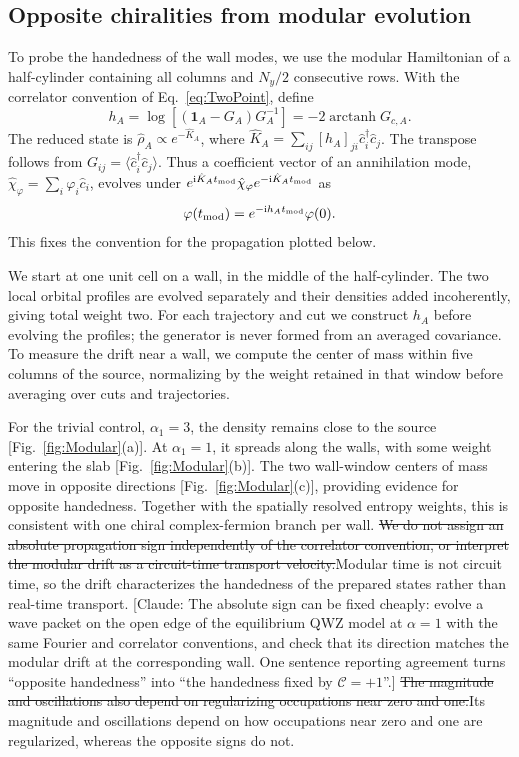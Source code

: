 \documentclass[aps,prb,10pt,twocolumn,superscriptaddress,longbibliography,floatfix]{revtex4-2}
\DeclareMathOperator\arctanh{arctanh}
\newcommand{\ii}{\mathrm{i}}
\newcommand{\mc}[1]{\mathcal{#1}}
\newcommand{\Id}{\mathbf{1}}
\newcommand{\claudeadd}[1]{{\color{orange}#1}}
\newcommand{\claudecom}[1]{{\color{ForestGreen}[Claude: #1]}}
\newcommand{\claudedel}[1]{{\color{orange}\sout{#1}}}
\begin{document}
{\color{blue}
\subsection{Opposite chiralities from modular evolution}
\label{sec:ModularEvolution}

To probe the handedness of the wall modes, we use the modular Hamiltonian of a half-cylinder containing all columns and $N_y/2$ consecutive rows. With the correlator convention of Eq.~\eqref{eq:TwoPoint}, define
\begin{equation}
 h_A=\log[(\Id_A-G_A)G_A^{-1}]=-2\arctanh G_{c,A}.
 \label{eq:ModularHamiltonian}
\end{equation}
The reduced state is $\hat\rho_A\propto e^{-\hat K_A}$, where $\hat K_A=\sum_{ij}[h_A]_{ji}\hat c_i^\dagger\hat c_j$. The transpose follows from $G_{ij}=\langle\hat c_i^\dagger\hat c_j\rangle$. Thus a coefficient vector of an annihilation mode, $\hat\chi_\varphi=\sum_i\varphi_i\hat c_i$, evolves under $e^{\ii\hat K_A t_{\rm mod}}\hat\chi_\varphi e^{-\ii\hat K_A t_{\rm mod}}$ as
\begin{equation}
 \varphi(t_{\rm mod})=e^{-\ii h_A t_{\rm mod}}\varphi(0).
 \label{eq:ModularEvolution}
\end{equation}
This fixes the convention for the propagation plotted below.

We start at one unit cell on a wall, in the middle of the half-cylinder. The two local orbital profiles are evolved separately and their densities added incoherently, giving total weight two. For each trajectory and cut we construct $h_A$ before evolving the profiles; the generator is never formed from an averaged covariance. To measure the drift near a wall, we compute the center of mass within five columns of the source, normalizing by the weight retained in that window before averaging over cuts and trajectories.

For the trivial control, $\alpha_1=3$, the density remains close to the source [Fig.~\ref{fig:Modular}(a)]. At $\alpha_1=1$, it spreads along the walls, with some weight entering the slab [Fig.~\ref{fig:Modular}(b)]. The two wall-window centers of mass move in opposite directions [Fig.~\ref{fig:Modular}(c)], providing evidence for opposite handedness. Together with the spatially resolved entropy weights, this is consistent with one chiral complex-fermion branch per wall. \claudedel{We do not assign an absolute propagation sign independently of the correlator convention, or interpret the modular drift as a circuit-time transport velocity.}\claudeadd{Modular time is not circuit time, so the drift characterizes the handedness of the prepared states rather than real-time transport.} \claudecom{The absolute sign can be fixed cheaply: evolve a wave packet on the open edge of the equilibrium QWZ model at $\alpha=1$ with the same Fourier and correlator conventions, and check that its direction matches the modular drift at the corresponding wall. One sentence reporting agreement turns ``opposite handedness'' into ``the handedness fixed by $\mc C=+1$''.} \claudedel{The magnitude and oscillations also depend on regularizing occupations near zero and one.}\claudeadd{Its magnitude and oscillations depend on how occupations near zero and one are regularized, whereas the opposite signs do not.}
}
\end{document}
